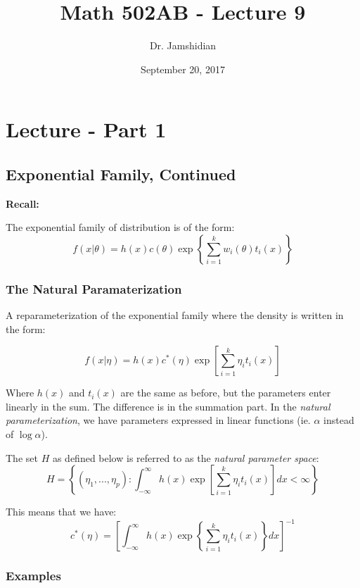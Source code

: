 \documentclass{article}
\title{Math 502AB - Lecture 9}
\author{Dr. Jamshidian}
\date{September 20, 2017}
\begin{document}
\maketitle
\section{Lecture - Part 1}

\subsection{Exponential Family, Continued}

\textbf{Recall:}

The exponential family of distribution is of the form:
\begin{equation*}
    f(x|\theta) = h(x) c(\theta) \exp \left\{ \sum_{i=1}^k w_i(\theta)t_i(x) \right\}
\end{equation*}

\subsubsection{The Natural Paramaterization}

A reparameterization of the exponential family where the density is written in the form:

\begin{equation*}
    f(x|\eta) = h(x) c^*(\eta) \exp\left[\sum_{i=1}^k \eta_i t_i(x) \right]
\end{equation*}

Where $h(x)$ and $t_i(x)$ are the same as before, but the parameters enter linearly in the sum. The difference is in the summation part. In the \textit{natural parameterization}, we have parameters expressed in linear functions (ie. $\alpha$ instead of $\log \alpha$).

The set $H$ as defined below is referred to as the \textit{natural parameter space}:
\begin{equation*}
H = \left\{(\eta_1,...,\eta_p): \int_{-\infty}^\infty h(x) \exp\left[ \sum_{i=1}^k \eta_i t_i(x)\right] dx < \infty \right\}
\end{equation*}

This means that we have:
\begin{equation*}
    c^*(\eta) = \left[\int_{-\infty}^\infty h(x) \exp\left\{ \sum_{i=1}^k \eta_i t_i(x)\right\} dx \right]^{-1}
\end{equation*}

\subsubsection*{Examples}
\end{document}
